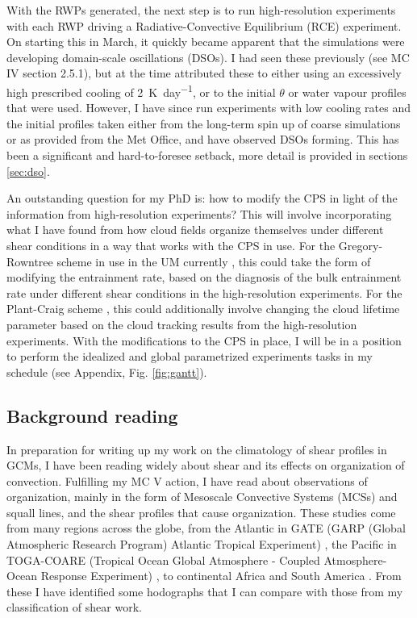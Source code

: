 \documentclass[11pt,a4paper]{article}
\begin{document}
With the RWPs generated, the next step is to run high-resolution experiments with each RWP driving a Radiative-Convective Equilibrium (RCE) experiment. On starting this in March, it quickly became apparent that the simulations were developing domain-scale oscillations (DSOs). I had seen these previously (see MC IV section 2.5.1), but at the time attributed these to either using an excessively high prescribed cooling of \SI{2}{K.day^{-1}}, or to the initial $\theta$ or water vapour profiles that were used. However, I have since run experiments with low cooling rates and the initial profiles taken either from the long-term spin up of coarse simulations or as provided from the Met Office, and have observed DSOs forming. This has been a significant and hard-to-foresee setback, more detail is provided in sections \ref{sec:dso}.

An outstanding question for my PhD is: how to modify the CPS in light of the information from high-resolution experiments? This will involve incorporating what I have found from how cloud fields organize themselves under different shear conditions in a way that works with the CPS in use. For the Gregory-Rowntree scheme in use in the UM currently \parencite{gregory1990mass}, this could take the form of modifying the entrainment rate, based on the diagnosis of the bulk entrainment rate under different shear conditions in the high-resolution experiments. For the Plant-Craig scheme \parencite{plant2008stochastic}, this could additionally involve changing the cloud lifetime parameter based on the cloud tracking results from the high-resolution experiments. With the modifications to the CPS in place, I will be in a position to perform the idealized and global parametrized experiments tasks in my schedule (see Appendix, Fig. \ref{fig:gantt}).

\subsection{Background reading}
\label{sec:Background reading}

In preparation for writing up my work on the climatology of shear profiles in GCMs, I have been reading widely about shear and its effects on organization of convection. Fulfilling my MC V action, I have read about observations of organization, mainly in the form of Mesoscale Convective Systems (MCSs) and squall lines, and the shear profiles that cause organization. These studies come from many regions across the globe, from the Atlantic in GATE (GARP (Global Atmospheric Research Program) Atlantic Tropical Experiment) \parencite{houze1977structure, zipser1977mesoscale}, the Pacific in TOGA-COARE (Tropical Ocean Global Atmosphere - Coupled Atmosphere-Ocean Response Experiment) \parencite{jorgensen1997structure}, to continental Africa \parencite{peters1988structure} and South America \parencite{cohen1995environmental}. From these I have identified some hodographs that I can compare with those from my classification of shear work.
\end{document}
